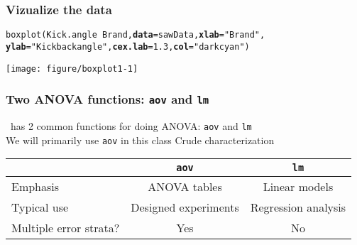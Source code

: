 \documentclass[color=usenames,dvipsnames]{beamer}\usepackage[]{graphicx}\usepackage[]{color}
\makeatletter
\newcommand{\hlnum}[1]{\textcolor[rgb]{0.69,0.494,0}{#1}}%
\newcommand{\hlstr}[1]{\textcolor[rgb]{0.749,0.012,0.012}{#1}}%
\newcommand{\hlopt}[1]{\textcolor[rgb]{0,0,0}{#1}}%
\newcommand{\hlstd}[1]{\textcolor[rgb]{0,0,0}{#1}}%
\newcommand{\hlkwc}[1]{\textcolor[rgb]{0,0,0}{\textbf{#1}}}%
\newcommand{\hlkwd}[1]{\textcolor[rgb]{0.004,0.004,0.506}{#1}}%
\newenvironment{kframe}{%
 \def\at@end@of@kframe{}%
 \ifinner\ifhmode%
  \def\at@end@of@kframe{\end{minipage}}%
  \begin{minipage}{\columnwidth}%
 \fi\fi%
 \def\FrameCommand##1{\hskip\@totalleftmargin \hskip-\fboxsep
 \colorbox{shadecolor}{##1}\hskip-\fboxsep
     \hskip-\linewidth \hskip-\@totalleftmargin \hskip\columnwidth}%
 \MakeFramed {\advance\hsize-\width
   \@totalleftmargin\z@ \linewidth\hsize
   \@setminipage}}%
 {\par\unskip\endMakeFramed%
 \at@end@of@kframe}
\newenvironment{knitrout}{}{} %
\newcommand{\inr}[1]{\colorbox{inlinecolor}{\texttt{#1}}}
\makeatother
\begin{document}
\begin{frame}[fragile]
  \frametitle{Vizualize the data}
\begin{knitrout}\scriptsize
{}\color{fgcolor}\begin{kframe}
\begin{alltt}
\hlkwd{boxplot}\hlstd{(Kick.angle} \hlopt{~} \hlstd{Brand,} \hlkwc{data}\hlstd{=sawData,} \hlkwc{xlab}\hlstd{=}\hlstr{"Brand"}\hlstd{,}
        \hlkwc{ylab}\hlstd{=}\hlstr{"Kickback angle"}\hlstd{,} \hlkwc{cex.lab}\hlstd{=}\hlnum{1.3}\hlstd{,} \hlkwc{col}\hlstd{=}\hlstr{"darkcyan"}\hlstd{)}
\end{alltt}
\end{kframe}
\end{knitrout}
\begin{center}
  \texttt{[image: figure/boxplot1-1]} %
\end{center}
\end{frame}








\begin{frame}[fragile]
  \frametitle{Two ANOVA functions: {\tt aov} and {\tt lm}}
  {\large
    \R~has 2 common functions for doing ANOVA: \inr{aov} and \inr{lm} \\
    \vfill
    We will primarily use \inr{aov} in this class
  }
  \vfill
  {%
    Crude characterization}
  \begin{center}
    \small
  \begin{tabular}[H]{lcc}
    \hline
      & {\tt aov} & {\tt lm} \\
    \hline
    Emphasis & ANOVA tables & Linear models \\
    Typical use & Designed experiments & Regression analysis \\
    Multiple error strata? & Yes & No \\
    \hline
  \end{tabular}
  \end{center}
\end{frame}
\end{document}
